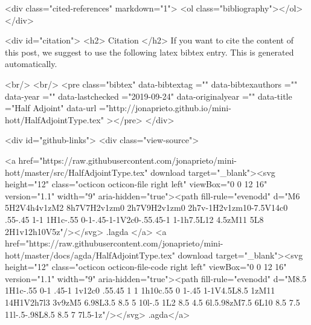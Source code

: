   <div class="cited-references" markdown="1">
  <ol class="bibliography"></ol>
  </div>


  
  <div id="citation">
  <h2> Citation </h2>
  If you want to cite the content of this post,
  we suggest to use the following latex bibtex entry.
  This is generated automatically.

  <br/>
  <br/>
  <pre class="bibtex"
       data-bibtextag =""
       data-bibtexauthors =""
       data-year =""
       data-lastchecked ="2019-09-24"
       data-originalyear =""
       data-title ="Half Adjoint"
       data-url ="http://jonaprieto.github.io/mini-hott/HalfAdjointType.tex"
  ></pre>
  </div>
  

  <div id="github-links">
    <div class="view-source">
      
        <a href="https://raw.githubusercontent.com/jonaprieto/mini-hott/master/src/HalfAdjointType.tex" download target="_blank"><svg height="12" class="octicon octicon-file right left" viewBox="0 0 12 16" version="1.1" width="9" aria-hidden="true"><path fill-rule="evenodd" d="M6 5H2V4h4v1zM2 8h7V7H2v1zm0 2h7V9H2v1zm0 2h7v-1H2v1zm10-7.5V14c0 .55-.45 1-1 1H1c-.55 0-1-.45-1-1V2c0-.55.45-1 1-1h7.5L12 4.5zM11 5L8 2H1v12h10V5z"/></svg> .lagda </a>
        <a href="https://raw.githubusercontent.com/jonaprieto/mini-hott/master/docs/agda/HalfAdjointType.tex" download target="_blank"><svg height="12" class="octicon octicon-file-code right left" viewBox="0 0 12 16" version="1.1" width="9" aria-hidden="true"><path fill-rule="evenodd" d="M8.5 1H1c-.55 0-1 .45-1 1v12c0 .55.45 1 1 1h10c.55 0 1-.45 1-1V4.5L8.5 1zM11 14H1V2h7l3 3v9zM5 6.98L3.5 8.5 5 10l-.5 1L2 8.5 4.5 6l.5.98zM7.5 6L10 8.5 7.5 11l-.5-.98L8.5 8.5 7 7l.5-1z"/></svg> .agda</a>
      
